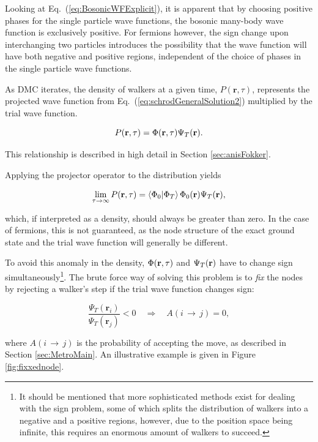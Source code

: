 Looking at Eq.~(\ref{eq:BosonicWFExplicit}), it is apparent that by choosing positive phases for the single particle wave functions, the bosonic many-body wave function is exclusively positive. For fermions however, the sign change upon interchanging two particles introduces the possibility that the wave function will have both negative and positive regions, independent of the choice of phases in the single particle wave functions.

As DMC iterates, the density of walkers at a given time, $P(\mathbf{r}, \tau)$, represents the projected wave function from Eq.~(\ref{eq:schrodGeneralSolution2}) multiplied by the trial wave function. 

\begin{equation}
 P(\mathbf{r}, \tau) = \Phi(\mathbf{r}, \tau)\Psi_T(\mathbf{r}).
\end{equation}

This relationship is described in high detail in Section \ref{sec:anisFokker}.

Applying the projector operator to the distribution yields

\begin{equation}
  \lim_{\tau\to\infty} P(\mathbf{r}, \tau) = \left\langle \Phi_0 | \Phi_T\right\rangle\Phi_0(\mathbf{r})\Psi_T(\mathbf{r}),
\end{equation}

which, if interpreted as a density, should always be greater than zero. In the case of fermions, this is not guaranteed, as
the node structure of the exact ground state and the trial wave function will generally be different.  

To avoid this anomaly in the density, $\Phi(\mathbf{r}, \tau)$ and $\Psi_T(\mathbf{r})$ have to change sign simultaneously\footnote{It should be mentioned that more sophisticated methods exist for dealing with the sign problem, some of which splits the distribution of walkers into a negative and a positive regions, however, due to the position space being infinite, this requires an enormous amount of walkers to succeed.}. The brute force way of solving this problem is to \textit{fix} the nodes by rejecting a walker's step if the trial wave function changes sign:

\begin{equation}
\frac{\Psi_T(\mathbf{r}_i)}{\Psi_T(\mathbf{r}_j)} < 0 \quad\Longrightarrow\quad A(i\,\rightarrow\,j) = 0,
\end{equation}

where $A(i\,\rightarrow\,j)$ is the probability of accepting the move, as described in Section \ref{sec:MetroMain}. An illustrative example is given in Figure \ref{fig:fixxednode}.

